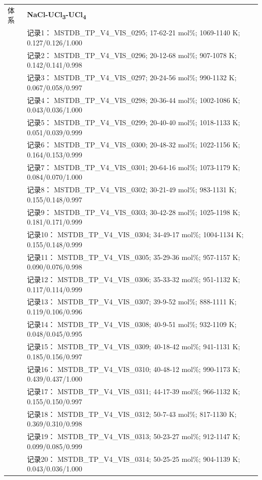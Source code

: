\documentclass[12pt]{article}
\begin{document}
{\begin{longtable}[]{@{}
  >{\raggedright\arraybackslash}p{}
  >{\raggedright\arraybackslash}p{}@{}}
\midrule
体系 & \textbf{NaCl-UCl\textsubscript{3}-UCl\textsubscript{4}} \\
 & 记录1： MSTDB\_TP\_V4\_VIS\_0295; 17-62-21 mol\%; 1069-1140 K; 0.127/0.126/1.000 \\
 & 记录2： MSTDB\_TP\_V4\_VIS\_0296; 20-12-68 mol\%; 907-1078 K; 0.142/0.141/0.998 \\
 & 记录3： MSTDB\_TP\_V4\_VIS\_0297; 20-24-56 mol\%; 990-1132 K; 0.067/0.058/0.997 \\
 & 记录4： MSTDB\_TP\_V4\_VIS\_0298; 20-36-44 mol\%; 1002-1086 K; 0.043/0.036/1.000 \\
 & 记录5： MSTDB\_TP\_V4\_VIS\_0299; 20-40-40 mol\%; 1018-1133 K; 0.051/0.039/0.999 \\
 & 记录6： MSTDB\_TP\_V4\_VIS\_0300; 20-48-32 mol\%; 1022-1156 K; 0.164/0.153/0.999 \\
 & 记录7： MSTDB\_TP\_V4\_VIS\_0301; 20-64-16 mol\%; 1073-1179 K; 0.084/0.070/1.000 \\
 & 记录8： MSTDB\_TP\_V4\_VIS\_0302; 30-21-49 mol\%; 983-1131 K; 0.155/0.148/0.997 \\
 & 记录9： MSTDB\_TP\_V4\_VIS\_0303; 30-42-28 mol\%; 1025-1198 K; 0.181/0.171/0.999 \\
 & 记录10： MSTDB\_TP\_V4\_VIS\_0304; 34-49-17 mol\%; 1004-1134 K; 0.155/0.148/0.999 \\
 & 记录11： MSTDB\_TP\_V4\_VIS\_0305; 35-29-36 mol\%; 957-1157 K; 0.090/0.076/0.998 \\
 & 记录12： MSTDB\_TP\_V4\_VIS\_0306; 35-33-32 mol\%; 951-1132 K; 0.117/0.114/0.999 \\
 & 记录13： MSTDB\_TP\_V4\_VIS\_0307; 39-9-52 mol\%; 888-1111 K; 0.119/0.106/0.996 \\
 & 记录14： MSTDB\_TP\_V4\_VIS\_0308; 40-9-51 mol\%; 932-1109 K; 0.048/0.045/0.995 \\
 & 记录15： MSTDB\_TP\_V4\_VIS\_0309; 40-18-42 mol\%; 941-1131 K; 0.185/0.156/0.997 \\
 & 记录16： MSTDB\_TP\_V4\_VIS\_0310; 40-48-12 mol\%; 990-1173 K; 0.439/0.437/1.000 \\
 & 记录17： MSTDB\_TP\_V4\_VIS\_0311; 44-17-39 mol\%; 966-1132 K; 0.155/0.150/0.997 \\
 & 记录18： MSTDB\_TP\_V4\_VIS\_0312; 50-7-43 mol\%; 817-1130 K; 0.369/0.310/0.998 \\
 & 记录19： MSTDB\_TP\_V4\_VIS\_0313; 50-23-27 mol\%; 912-1147 K; 0.099/0.085/0.999 \\
 & 记录20： MSTDB\_TP\_V4\_VIS\_0314; 50-25-25 mol\%; 904-1139 K; 0.043/0.036/1.000 \\

\end{longtable}}
\end{document}
